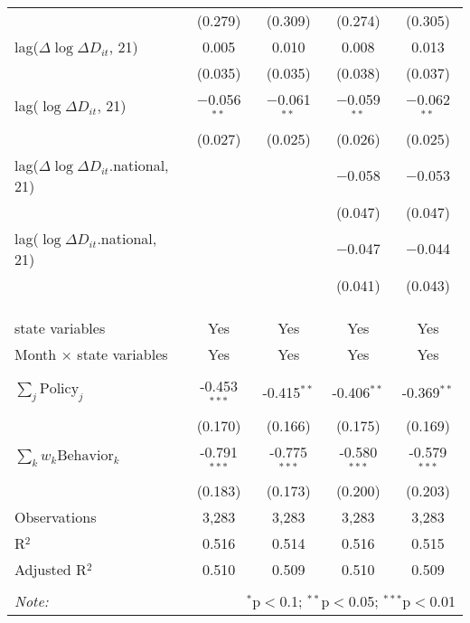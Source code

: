 \begin{tabular}{@{\extracolsep{1pt}}lcccc}
  & (0.279) & (0.309) & (0.274) & (0.305) \\ 
  lag($\Delta \log \Delta D_{it}$, 21) & 0.005 & 0.010 & 0.008 & 0.013 \\ 
  & (0.035) & (0.035) & (0.038) & (0.037) \\ 
  lag($\log \Delta D_{it}$, 21) & $-$0.056$^{**}$ & $-$0.061$^{**}$ & $-$0.059$^{**}$ & $-$0.062$^{**}$ \\ 
  & (0.027) & (0.025) & (0.026) & (0.025) \\ 
  lag($\Delta \log \Delta D_{it}$.national, 21) &  &  & $-$0.058 & $-$0.053 \\ 
  &  &  & (0.047) & (0.047) \\ 
  lag($\log \Delta D_{it}$.national, 21) &  &  & $-$0.047 & $-$0.044 \\ 
  &  &  & (0.041) & (0.043) \\ 
   &  &  &  &  \\ 
  &  &  &  &  \\ 
 \hline \\[-1.8ex] 
state variables & Yes & Yes & Yes & Yes \\ 
Month $\times$ state variables & Yes & Yes & Yes & Yes \\ 
\hline \\[-1.8ex] 
$\sum_j \mathrm{Policy}_j$ & -0.453$^{***}$ & -0.415$^{**}$ & -0.406$^{**}$ & -0.369$^{**}$ \\ 
 & (0.170) & (0.166) & (0.175) & (0.169) \\ 
$\sum_k w_k \mathrm{Behavior}_k$ & -0.791$^{***}$ & -0.775$^{***}$ & -0.580$^{***}$ & -0.579$^{***}$ \\ 
 & (0.183) & (0.173) & (0.200) & (0.203) \\ 
Observations & 3,283 & 3,283 & 3,283 & 3,283 \\ 
R$^{2}$ & 0.516 & 0.514 & 0.516 & 0.515 \\ 
Adjusted R$^{2}$ & 0.510 & 0.509 & 0.510 & 0.509 \\ 
\hline 
\hline \\[-1.8ex] 
\textit{Note:}  & \multicolumn{4}{r}{$^{*}$p$<$0.1; $^{**}$p$<$0.05; $^{***}$p$<$0.01} \\ 
\end{tabular} 